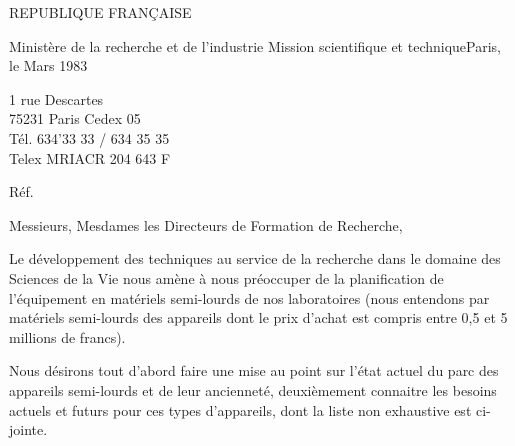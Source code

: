 REPUBLIQUE FRANÇAISE

Ministère de la recherche et de l'industrie
Mission scientifique et technique\hfill Paris, le Mars 1983

1 rue Descartes\\
75231 Paris Cedex 05\\
Tél. 634'33 33 / 634 35 35\\
Telex MRIACR 204 643 F

Réf.


Messieurs, Mesdames les Directeurs de Formation de Recherche,

Le développement des techniques au service de la recherche dans
le domaine des Sciences de la Vie nous amène à nous préoccuper de la
planification de l'équipement en matériels semi-lourds de nos laboratoires
(nous entendons par matériels semi-lourds des appareils dont le prix
d'achat est compris entre 0,5 et 5 millions de francs).

Nous désirons tout d'abord faire une mise au point sur l'état actuel
du parc des appareils semi-lourds et de leur ancienneté, deuxièmement
connaitre les besoins actuels et futurs pour ces types d'appareils, dont
la liste non exhaustive est ci-jointe.

